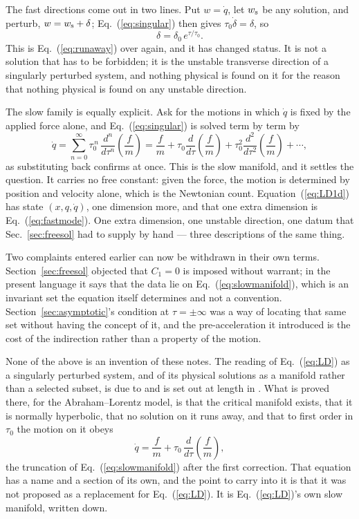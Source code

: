 \documentclass[preprint]{aastex701}
\newcommand{\taunought}{\tau_0}
\begin{document}
The fast directions come out in two lines. Put $w=\dot q$, let $w_{\rm s}$ be
any solution, and perturb, $w = w_{\rm s}+\delta$; Eq.~(\ref{eq:singular}) then
gives $\taunought\dot\delta = \delta$, so
\begin{equation}
\delta = \delta_0\,e^{\tau/\taunought}.
\label{eq:fastmode}
\end{equation}
This is Eq.~(\ref{eq:runaway}) over again, and it has changed status. It is not
a solution that has to be forbidden; it is the unstable transverse direction of
a singularly perturbed system, and nothing physical is found on it for the
reason that nothing physical is found on any unstable direction.

The slow family is equally explicit. Ask for the motions in which $\dot q$ is
fixed by the applied force alone, and Eq.~(\ref{eq:singular}) is solved term by
term by
\begin{equation}
\dot q = \sum_{n=0}^{\infty}\taunought^{\,n}\,
\frac{d^n}{d\tau^n}\!\left(\frac{f}{m}\right)
= \frac{f}{m} + \taunought\frac{d}{d\tau}\!\left(\frac{f}{m}\right)
+ \taunought^{2}\frac{d^2}{d\tau^2}\!\left(\frac{f}{m}\right) + \cdots,
\label{eq:slowmanifold}
\end{equation}
as substituting back confirms at once. This is the slow manifold, and it
settles the question. It carries no free constant: given the force, the motion
is determined by position and velocity alone, which is the Newtonian count.
Equation~(\ref{eq:LD1d}) has state $(x,q,\dot q)$, one dimension more, and that
one extra dimension is Eq.~(\ref{eq:fastmode}). One extra dimension, one
unstable direction, one datum that Sec.~\ref{sec:freesol} had to supply by hand
--- three descriptions of the same thing.

Two complaints entered earlier can now be withdrawn in their own terms.
Section~\ref{sec:freesol} objected that $C_1=0$ is imposed without warrant; in
the present language it says that the data lie on
Eq.~(\ref{eq:slowmanifold}), which is an invariant set the equation itself
determines and not a convention. Section~\ref{sec:asymptotic}'s condition at
$\tau=\pm\infty$ was a way of locating that same set without having the concept
of it, and the pre-acceleration it introduced is the cost of the indirection
rather than a property of the motion.

None of the above is an invention of these notes. The reading of
Eq.~(\ref{eq:LD}) as a singularly perturbed system, and of its physical
solutions as a manifold rather than a selected subset, is due to
\citet{spohn2000} and is set out at length in \citet{spohn2004}. What is proved
there, for the Abraham--Lorentz model, is that the critical manifold exists,
that it is normally hyperbolic, that no solution on it runs away, and that to
first order in $\taunought$ the motion on it obeys
\begin{equation}
\dot q = \frac{f}{m} + \taunought\,\frac{d}{d\tau}\!\left(\frac{f}{m}\right),
\label{eq:LL1d}
\end{equation}
the truncation of Eq.~(\ref{eq:slowmanifold}) after the first correction. That
equation has a name and a section of its own, and the point to carry into it is
that it was not proposed as a replacement for Eq.~(\ref{eq:LD}). It is
Eq.~(\ref{eq:LD})'s own slow manifold, written down.
\end{document}
